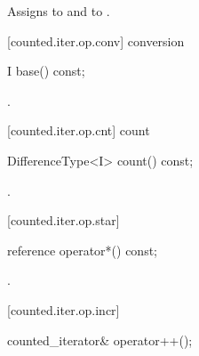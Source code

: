 \begin{addedblock}
\begin{itemdescr}
\pnum
\effects Assigns  to
 and  to .

\end{itemdescr}

[counted.iter.op.conv]{ conversion}

%
%
\begin{itemdecl}
I base() const;
\end{itemdecl}

\begin{itemdescr}
\pnum
\returns {}.
\end{itemdescr}

[counted.iter.op.cnt]{ count}

%
%
\begin{itemdecl}
DifferenceType<I> count() const;
\end{itemdecl}

\begin{itemdescr}
\pnum
\returns {}.
\end{itemdescr}

[counted.iter.op.star]{}

%
%
\begin{itemdecl}
reference operator*() const;
\end{itemdecl}

\begin{itemdescr}
\pnum
\returns {}.
\end{itemdescr}

[counted.iter.op.incr]{}

%
%
\begin{itemdecl}
counted_iterator& operator++();
\end{itemdecl}

\begin{itemdescr}
\pnum
\requires {}


\end{itemdescr}
\end{addedblock}
